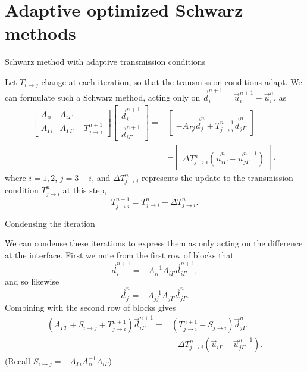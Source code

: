 \documentclass{beamer}
\begin{document}
\section{Adaptive optimized Schwarz methods} %

\begin{frame}{Schwarz method with adaptive transmission conditions}

Let $T_{i \to j}$ change at each iteration, so that the transmission conditions adapt.
We can formulate such a Schwarz method, acting only on $\vec{d}_i^{n+1} = \vec{u}_i^{n+1} - \vec{u}_i^n$, as
\begin{align*}
	\begin{bmatrix} A_{ii} & A_{i \Gamma} \\ A_{\Gamma i} & A_{\Gamma \Gamma} + T_{j \to i}^{n+1} \end{bmatrix}
	\begin{bmatrix} \vec{d}_i^{n+1} \\ \vec{d}_{i \Gamma}^{n+1} \end{bmatrix}
	= & \begin{bmatrix} ~ \\ -A_{\Gamma j} \vec{d}_j^n + T_{j \to i}^{n+1} \vec{d}_{j \Gamma}^n \end{bmatrix} \\
	& - \begin{bmatrix} ~ \\ \Delta T_{j \to i}^n \left ( \vec{u}_{i \Gamma}^n - \vec{u}_{j \Gamma}^{n-1} \right ) \end{bmatrix},
\end{align*}
where $i=1,2$, $j=3-i$, and $\Delta T_{j \to i}^n$ represents the update to the transmission condition $T_{j \to i}^n$ at this step,
\begin{equation*}
	T_{j \to i}^{n+1} = T_{j \to i}^n + \Delta T_{j \to i}^n.
\end{equation*}
\end{frame}

\begin{frame}{Condensing the iteration}

We can condense these iterations to express them as only acting on the difference at the interface.
First we note from the first row of blocks that
\begin{equation*}
	\vec{d}_i^{n+1} = -A_{ii}^{-1} A_{i \Gamma} \vec{d}_{i \Gamma}^{n+1},
\end{equation*}
and so likewise
\begin{equation*}
	\vec{d}_j^{n} = -A_{jj}^{-1} A_{j \Gamma} \vec{d}_{j \Gamma}^{n}.
\end{equation*}
Combining with the second row of blocks gives
\begin{align*}
	\left ( A_{\Gamma \Gamma} + S_{i \to j} + T_{j \to i}^{n+1} \right ) \vec{d}_{i \Gamma}^{n+1} =
	& \left ( T_{j \to i}^{n+1} - S_{j \to i} \right ) \vec{d}_{j \Gamma}^n \\
	& - \Delta T_{j \to i}^n \left ( \vec{u}_{i \Gamma} - \vec{u}_{j \Gamma}^{n-1} \right ).
\end{align*}
(Recall $S_{i \to j} = -A_{\Gamma i} A_{ii}^{-1} A_{i \Gamma}$)
\end{frame}
\end{document}
